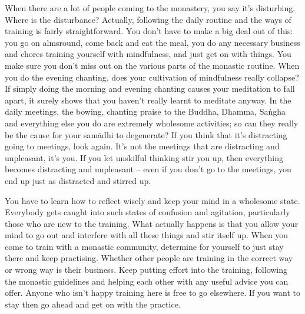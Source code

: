 When there are a lot of people coming to the monastery, you say it's disturbing. Where is the disturbance? Actually, following the daily routine and the ways of training is fairly straightforward. You don't have to make a big deal out of this: you go on almsround, come back and eat the meal, you do any necessary business and chores training yourself with mindfulness, and just get on with things. You make sure you don't miss out on the various parts of the monastic routine. When you do the evening chanting, does your cultivation of mindfulness really collapse? If simply doing the morning and evening chanting causes your meditation to fall apart, it surely shows that you haven't really learnt to meditate anyway. In the daily meetings, the bowing, chanting praise to the Buddha, Dhamma, Sa\.ngha and everything else you do are extremely wholesome activities; so can they really be the cause for your sam\=adhi to degenerate? If you think that it's distracting going to meetings, look again. It's not the meetings that are distracting and unpleasant, it's you. If you let unskilful thinking stir you up, then everything becomes distracting and unpleasant -- even if you don't go to the meetings, you end up just as distracted and stirred up.

You have to learn how to reflect wisely and keep your mind in a wholesome state. Everybody gets caught into such states of confusion and agitation, particularly those who are new to the training. What actually happens is that you allow your mind to go out and interfere with all these things and stir itself up. When you come to train with a monastic community, determine for yourself to just stay there and keep practising. Whether other people are training in the correct way or wrong way is their business. Keep putting effort into the training, following the monastic guidelines and helping each other with any useful advice you can offer. Anyone who isn't happy training here is free to go elsewhere. If you want to stay then go ahead and get on with the practice.

